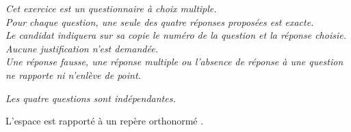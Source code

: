 \medskip

\emph{Cet exercice est un questionnaire à choix multiple.\\
Pour chaque question, une seule des quatre réponses proposées est exacte.\\
Le candidat indiquera sur sa copie le numéro de la question et la réponse choisie.\\
Aucune justification n'est demandée. \\
Une réponse fausse, une réponse multiple ou l'absence de réponse à une question ne rapporte ni n'enlève de point.}

\emph{Les quatre questions sont indépendantes.}

\medskip

L'espace est rapporté à un repère orthonormé \Oijk.

\medskip


